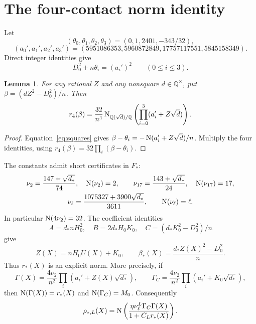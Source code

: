 \documentclass[11pt,a4paper]{article}
\newtheorem{lemma}[theorem]{Lemma}
\newcommand{\Q}{\mathbb Q}\newcommand{\Z}{\mathbb Z}
\begin{document}
\section{The four-contact norm identity}
Let
\[
 (\theta_0,\theta_1,\theta_2,\theta_3)=(0,1,2401,-343/32),
\]
\[
 (a_0',a_1',a_2',a_3')
 =(5951086353,5960872849,17757117551,5845158349).
\]
Direct integer identities give
\begin{equation}\label{eq:squares}
                         D_0^2+n\theta_i=(a_i')^2
                         \qquad(0\le i\le3).
\end{equation}

\begin{lemma}\label{lem:norm}
For any rational $Z$ and any nonsquare $d\in\Q^\times$, put
$\beta=(dZ^2-D_0^2)/n$. Then
\[
 r_4(\beta)=\frac{32}{n^4}
 \Nm_{\Q(\sqrt d)/\Q}\left(\prod_{i=0}^3(a_i'+Z\sqrt d)\right).
\]
\end{lemma}
\begin{proof}
Equation~\eqref{eq:squares} gives
$\beta-\theta_i=-\operatorname{N}(a_i'+Z\sqrt d)/n$.
Multiply the four identities, using
$r_4(\beta)=32\prod_i(\beta-\theta_i)$.
\end{proof}

The constants admit short certificates in $F_*$:
\begin{equation}\label{eq:constantnorms}
\begin{gathered}
 \nu_2=\frac{147+\sqrt{d_*}}{74},\quad \operatorname{N}(\nu_2)=2,\qquad
 \nu_{17}=\frac{143+\sqrt{d_*}}{24},\quad\operatorname{N}(\nu_{17})=17,\\
 \nu_\ell=\frac{1075327+3900\sqrt{d_*}}{3611},
 \qquad\operatorname{N}(\nu_\ell)=\ell.
\end{gathered}
\end{equation}
In particular $\operatorname{N}(4\nu_2)=32$.
The coefficient identities
\[
 A=d_*nH_0^2,\quad B=2d_*H_0K_0,\quad
 C=(d_*K_0^2-D_0^2)/n
\]
give
\begin{equation}\label{eq:z}
 Z(X)=nH_0U(X)+K_0,\qquad
 \beta_*(X)=\frac{d_*Z(X)^2-D_0^2}{n}.
\end{equation}
Thus $r_*(X)$ is an explicit norm. More precisely, if
\[
 \Gamma(X)=\frac{4\nu_2}{n^2}
             \prod_i(a_i'+Z(X)\sqrt{d_*}),\qquad
 \Gamma_C=\frac{4\nu_2}{n^2}
             \prod_i(a_i'+K_0\sqrt{d_*}),
\]
then $\operatorname{N}(\Gamma(X))=r_*(X)$ and $\operatorname{N}(\Gamma_C)=M_0$.
Consequently
\begin{equation}\label{eq:rhonorm}
 \rho_{*,L}(X)=
 \operatorname{N}\left(\frac{\eta\nu_\ell^L\Gamma_C\Gamma(X)}
                       {1+C_Lr_*(X)}\right).
\end{equation}
\end{document}
